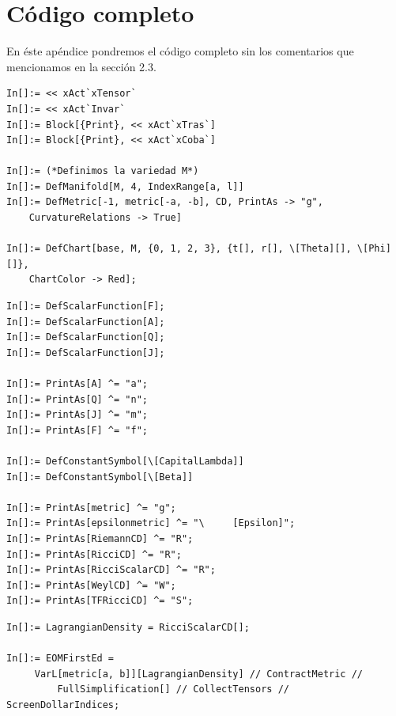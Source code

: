 \documentclass[12pt]{book}
\begin{document}
\chapter{Código completo}

En éste apéndice pondremos el código completo sin los comentarios que mencionamos en la sección 2.3.

\begin{lstlisting}[caption={Carga de las paqueterias para la automatización, definición de la métrica (xTensor) y la carta (xCoba)}, label={lst:automatizacion-parametros}]
In[]:= << xAct`xTensor`
In[]:= << xAct`Invar`
In[]:= Block[{Print}, << xAct`xTras`]
In[]:= Block[{Print}, << xAct`xCoba`]

In[]:= (*Definimos la variedad M*)
In[]:= DefManifold[M, 4, IndexRange[a, l]] 
In[]:= DefMetric[-1, metric[-a, -b], CD, PrintAs -> "g", 
    CurvatureRelations -> True]

In[]:= DefChart[base, M, {0, 1, 2, 3}, {t[], r[], \[Theta][], \[Phi][]}, 
    ChartColor -> Red];    
\end{lstlisting}


\begin{lstlisting}[caption={}]
In[]:= DefScalarFunction[F];
In[]:= DefScalarFunction[A];
In[]:= DefScalarFunction[Q];
In[]:= DefScalarFunction[J];

In[]:= PrintAs[A] ^= "a";
In[]:= PrintAs[Q] ^= "n";
In[]:= PrintAs[J] ^= "m";
In[]:= PrintAs[F] ^= "f";

In[]:= DefConstantSymbol[\[CapitalLambda]]
In[]:= DefConstantSymbol[\[Beta]]

In[]:= PrintAs[metric] ^= "g";
In[]:= PrintAs[epsilonmetric] ^= "\     [Epsilon]";
In[]:= PrintAs[RiemannCD] ^= "R";
In[]:= PrintAs[RicciCD] ^= "R";
In[]:= PrintAs[RicciScalarCD] ^= "R";
In[]:= PrintAs[WeylCD] ^= "W";
In[]:= PrintAs[TFRicciCD] ^= "S";
\end{lstlisting}



\begin{lstlisting}[caption={Densidad lagrangiana y su variación respecto al métrica inversa}, label={lst:automatizacion-varlagrangian}]
In[]:= LagrangianDensity = RicciScalarCD[];

In[]:= EOMFirstEd = 
     VarL[metric[a, b]][LagrangianDensity] // ContractMetric // 
         FullSimplification[] // CollectTensors // ScreenDollarIndices;
\end{lstlisting}
\end{document}
